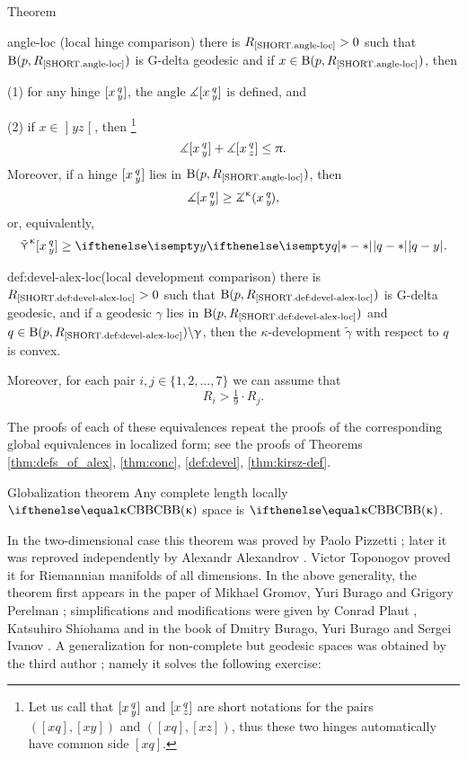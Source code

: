 \begin{thm}{Theorem}
\begin{subthmN}{angle-loc} (local hinge comparison) 
there is $R_{\hbox{\rm\scriptsize\ref{SHORT.angle-loc}}}>0$ such that $\mathrm{B}{}(p,R_{\hbox{\rm\scriptsize\ref{SHORT.angle-loc}}})$ is G-delta geodesic and if $x\in \oBall(p,R_{\hbox{\rm\scriptsize\ref{SHORT.angle-loc}}})$, then 

(1) for any hinge $[x\,{}^{q}_{y}]$, the angle 
$\measuredangle[x\,{}^{q}_{y}]$ is defined, and

 (2) if $x\in \mathopen{]}y z\mathclose{[}$, then%
\footnote{Let us call that $[x\,{}^{q}_{y}]$ and $[x\,{}^{q}_{z}]$  are short notations for the pairs $([x q],[x y])$ and $([x q],[x z])$, 
thus these two hinges automatically have common side $[x q]$.}
\[\mangle\hinge x q y+ \mangle\hinge x q z\le\pi.\]
Moreover, if a hinge $[x\,{}^{q}_{y}]$ lies in $\mathrm{B}{}(p,R_{\hbox{\rm\scriptsize\ref{SHORT.angle-loc}}})$, then 
\[\mangle\hinge x q y
\ge\angk\kappa x q y,\]
or, equivalently,
\[\side\kappa \hinge x q y\ge\dist{q}{ y}{}.\]
\end{subthmN}


\begin{subthmN}{def:devel-alex-loc}(local development comparison) 
there is $R_{\hbox{\rm\scriptsize\ref{SHORT.def:devel-alex-loc}}}>0$ 
such that $\mathrm{B}{}(p,R_{\hbox{\rm\scriptsize\ref{SHORT.def:devel-alex-loc}}})$ 
is G-delta geodesic, and if a geodesic $\gamma$ lies in $\mathrm{B}{}(p,R_{\hbox{\rm\scriptsize\ref{SHORT.def:devel-alex-loc}}})$ and $q\in 
\oBall(p,R_{\hbox{\rm\scriptsize\ref{SHORT.def:devel-alex-loc}}})
\backslash \gamma$, then the $\kappa$-development $\tilde \gamma$ with respect to $q$ is convex.
\end{subthmN}
Moreover, for each pair $i,j\in \{1,2,\dots,7\}$ we can assume that 
\[R_i>\tfrac{1}{9}\cdot R_j.\]
\end{thm}

The proofs of each of these equivalences repeat the proofs of the corresponding global equivalences in localized form; see the proofs of Theorems \ref{thm:defs_of_alex}, \ref{thm:conc}, \ref{def:devel}, \ref{thm:kirsz-def}.


\begin{thm}{Globalization theorem}\label{thm:glob} 
Any complete length locally $\Alex\kappa$ space is $\Alex\kappa$.
\end{thm}

{\sloppy

In the two-dimensional case this theorem was proved by Paolo Pizzetti \cite{pizzetti};
later it was reproved independently by Alexandr Alexandrov \cite{alexandrov:devel}. %
Victor Toponogov \cite{toponogov-globalization+splitting} proved it for Riemannian manifolds of all dimensions.
In the above generality, the theorem first appears in the paper of Mikhael Gromov, Yuri Burago and Grigory Perelman \cite{burago-gromov-perelman}; 
simplifications and modifications were given by Conrad Plaut \cite{plaut:dimension}, Katsuhiro Shiohama \cite{shiohama} and in the book of Dmitry Burago, Yuri Burago and Sergei Ivanov \cite{burago-burago-ivanov}.
A generalization for non-complete but geodesic spaces was obtained by the third author \cite{petrunin:globalization}; namely it solves the following exercise:

}

